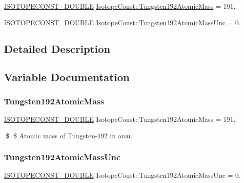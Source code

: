 \begin{DoxyCompactItemize}
\item 
\mbox{\hyperlink{group___isotope_const-_macros_ga8f45a7272ce02c0b4c65c44636ed719a}{I\+S\+O\+T\+O\+P\+E\+C\+O\+N\+S\+T\+\_\+\+D\+O\+U\+B\+LE}} \mbox{\hyperlink{group___isotope_const-_tungsten-_w192_ga8dcc0cac893e00ef8b18656a8ae40f32}{Isotope\+Const\+::\+Tungsten192\+Atomic\+Mass}} = 191.
\item 
\mbox{\hyperlink{group___isotope_const-_macros_ga8f45a7272ce02c0b4c65c44636ed719a}{I\+S\+O\+T\+O\+P\+E\+C\+O\+N\+S\+T\+\_\+\+D\+O\+U\+B\+LE}} \mbox{\hyperlink{group___isotope_const-_tungsten-_w192_ga673ea05b34fd05371658aa4de8ac5784}{Isotope\+Const\+::\+Tungsten192\+Atomic\+Mass\+Unc}} = 0.
\end{DoxyCompactItemize}


\subsection{Detailed Description}


\subsection{Variable Documentation}
\mbox{\label{group___isotope_const-_tungsten-_w192_ga8dcc0cac893e00ef8b18656a8ae40f32}} 
\subsubsection{\texorpdfstring{Tungsten192\+Atomic\+Mass}{Tungsten192AtomicMass}}
{\footnotesize\ttfamily \mbox{\hyperlink{group___isotope_const-_macros_ga8f45a7272ce02c0b4c65c44636ed719a}{I\+S\+O\+T\+O\+P\+E\+C\+O\+N\+S\+T\+\_\+\+D\+O\+U\+B\+LE}} Isotope\+Const\+::\+Tungsten192\+Atomic\+Mass = 191.}

\$ \$ Atomic mass of Tungsten-\/192 in amu. \mbox{\label{group___isotope_const-_tungsten-_w192_ga673ea05b34fd05371658aa4de8ac5784}} 
\subsubsection{\texorpdfstring{Tungsten192\+Atomic\+Mass\+Unc}{Tungsten192AtomicMassUnc}}
{\footnotesize\ttfamily \mbox{\hyperlink{group___isotope_const-_macros_ga8f45a7272ce02c0b4c65c44636ed719a}{I\+S\+O\+T\+O\+P\+E\+C\+O\+N\+S\+T\+\_\+\+D\+O\+U\+B\+LE}} Isotope\+Const\+::\+Tungsten192\+Atomic\+Mass\+Unc = 0.}

